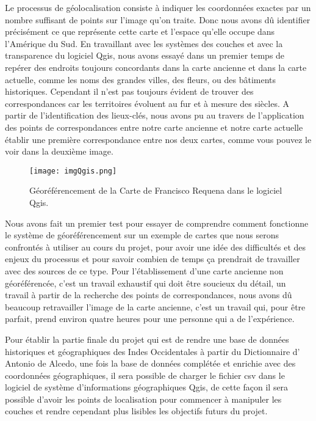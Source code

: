 \documentclass[a4paper,12pt,twoside]{book}
\begin{document}
Le processus de géolocalisation consiste à indiquer les coordonnées exactes par un nombre suffisant de points sur l’image qu’on traite. Donc nous avons dû identifier précisément ce que représente cette carte et l’espace qu’elle occupe dans l’Amérique du Sud. En travaillant avec les systèmes des couches et avec la transparence du logiciel Qgis, nous avons essayé dans un premier temps de repérer des endroits toujours concordants dans la carte ancienne et dans la carte actuelle, comme les noms des grandes villes, des fleurs, ou des bâtiments historiques. Cependant il n’est pas toujours évident de trouver des correspondances car les territoires évoluent au fur et à mesure des siècles. A partir de l’identification des lieux-clés, nous avons pu au travers de l’application des points de correspondances entre notre carte ancienne et notre carte actuelle établir une première correspondance entre nos deux cartes, comme vous pouvez le voir dans la deuxième image.

\begin{figure}[!h]
    \centering
    \texttt{[image: imgQgis.png]}
    \caption{Géoréférencement de la Carte de Francisco Requena dans le logiciel Qgis.}
    \label{douzeFig}
\end{figure}

Nous avons fait un premier test pour essayer de comprendre comment fonctionne le système de géoréférencement sur un exemple de cartes que nous serons confrontés à utiliser au cours du projet, pour avoir une idée des difficultés et des enjeux du processus et pour savoir combien de temps ça prendrait de travailler avec des sources de ce type. Pour l’établissement d’une carte ancienne non géoréférencée, c’est un travail exhaustif qui doit être soucieux du détail, un travail à partir de la recherche des points de correspondances, nous avons dû beaucoup retravailler l’image de la carte ancienne, c’est un travail qui, pour être parfait, prend environ quatre heures pour une personne qui a de l’expérience.  

Pour établir la partie finale du projet qui est de rendre une base de données historiques et géographiques des Indes Occidentales à partir du Dictionnaire d’ Antonio de Alcedo, une fois la base de données complétée et enrichie avec des coordonnées géographiques, il sera possible de charger le fichier csv dans le logiciel de système d’informations géographiques Qgis, de cette façon il sera possible d’avoir les points de localisation pour commencer à manipuler les couches et rendre cependant plus lisibles les objectifs futurs du projet. 
\end{document}
